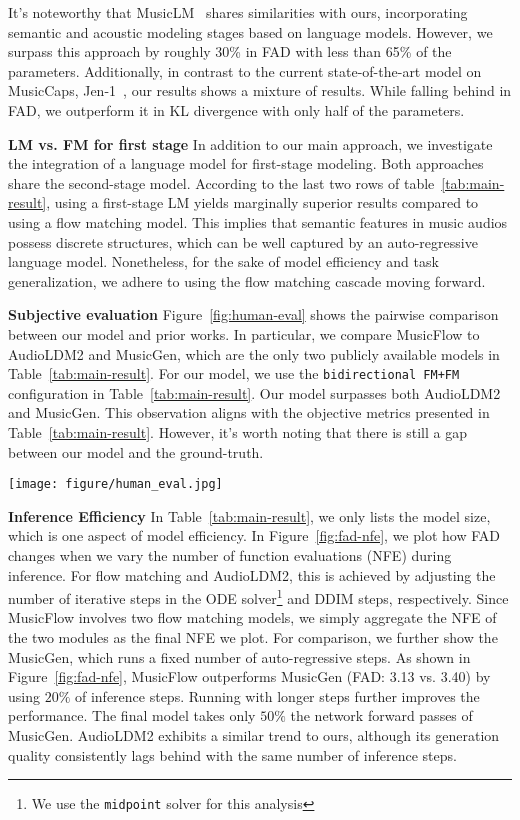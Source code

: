 It's noteworthy that MusicLM~\cite{musiclm} shares similarities with ours, incorporating semantic and acoustic modeling stages based on language models. However, we surpass this approach by roughly 30\% in FAD with less than 65\% of the parameters. Additionally, in contrast to the current state-of-the-art model on MusicCaps, Jen-1~\cite{jen1}, our results shows a mixture of results. While falling behind in FAD, we outperform it in KL divergence with only half of the parameters.

\textbf{LM vs. FM for first stage} In addition to our main approach, we investigate the integration of a language model for first-stage modeling. Both approaches share the second-stage model. According to the last two rows of table~\ref{tab:main-result}, using a first-stage LM yields marginally superior results compared to using a flow matching model. This implies that semantic features in music audios possess discrete structures, which can be well captured by an auto-regressive language model. Nonetheless, for the sake of model efficiency and task generalization, we adhere to using the flow matching cascade moving forward.   

\textbf{Subjective evaluation} Figure~\ref{fig:human-eval} shows the pairwise comparison between our model and prior works. In particular, we compare MusicFlow to AudioLDM2 and MusicGen, which are the only two publicly available models in Table~\ref{tab:main-result}.
For our model, we use the \texttt{bidirectional FM+FM} configuration in Table~\ref{tab:main-result}.
Our model surpasses both AudioLDM2 and MusicGen.
This observation aligns with the objective metrics presented in Table~\ref{tab:main-result}. However, it's worth noting that there is still a gap between our model and the ground-truth.

\begin{figure*}
    \centering
    \label{fig:human-eval}
    \texttt{[image: figure/human\_eval.jpg]}
    \vspace{-0.1in}
    \caption{Pairwise comparison between MusicFlow, AudioLDM2, MusicGen and ground-truth}
\end{figure*}

\textbf{Inference Efficiency} In Table~\ref{tab:main-result}, we only lists the model size, which is one aspect of model efficiency.  In Figure~\ref{fig:fad-nfe}, we plot how FAD changes when we vary the number of function evaluations (NFE) during inference. For flow matching and AudioLDM2, this is achieved by adjusting the number of iterative steps in the ODE solver\footnote{We use the \texttt{midpoint} solver for this analysis} and DDIM steps, respectively. Since MusicFlow involves two flow matching models, we simply aggregate the NFE of the two modules as the final NFE we plot. For comparison, we further show the MusicGen, which runs a fixed number of auto-regressive steps. As shown in Figure~\ref{fig:fad-nfe}, MusicFlow outperforms MusicGen (FAD: 3.13 vs. 3.40) by using $20\%$ of inference steps. Running with longer steps further improves the performance. The final model takes only $50\%$ the network forward passes of MusicGen. 
AudioLDM2 exhibits a similar trend to ours, although its generation quality consistently lags behind with the same number of inference steps.


